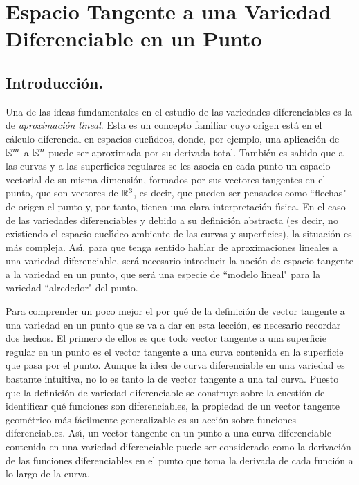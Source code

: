 \documentclass[cursovd_portada.tex]{subfiles}
\begin{document}
\chapter{Espacio Tangente a una Variedad Diferenciable en un Punto}
\section{Introducci\'{o}n.}
\hs Una de las ideas fundamentales en el estudio de las variedades
diferenciables es la de {\it aproximaci\'{o}n lineal}. Esta es un
concepto familiar cuyo origen est\'{a} en el c\'{a}lculo
diferencial en espacios eucl\'{\i}deos, donde, por ejemplo, una
aplicaci\'{o}n de $\mathbb{R}^m$ a $\mathbb{R}^n$ puede ser aproximada por su
derivada total. Tambi\'{e}n es sabido que a las curvas y a las
superficies regulares se les asocia en cada punto un espacio
vectorial de su misma dimensi\'{o}n, formados por sus vectores
tangentes en el punto, que son vectores de $\mathbb{R}^3$, es decir, que
pueden ser pensados como ``flechas" de origen el punto y, por
tanto, tienen una clara interpretaci\'{o}n f\'{\i}sica. En el caso
de las variedades diferenciables y debido a su definici\'{o}n
abstracta (es decir, no existiendo el espacio eucl\'{\i}deo
ambiente de las curvas y superficies), la situaci\'{o}n es m\'{a}s
compleja. As\'{\i}, para que tenga sentido hablar de
aproximaciones lineales a una variedad diferenciable, ser\'{a}
necesario introducir la noci\'{o}n de espacio tangente a la
variedad en un punto, que ser\'{a} una especie de ``modelo lineal"
para la variedad ``alrededor" del punto.
\par
Para comprender un poco mejor el por qu\'{e} de la definici\'{o}n  de vector tangente a una variedad en un punto que se va
a dar en esta lecci\'{o}n, es necesario recordar dos hechos. El primero de ellos es que todo vector tangente a una
superficie regular en un punto es el vector tangente a una curva contenida en la superficie que pasa por el punto.
Aunque la idea de curva diferenciable en una variedad es bastante intuitiva, no lo es tanto la de vector tangente
a una tal curva. Puesto que la definici\'{o}n de variedad diferenciable se construye sobre la cuesti\'{o}n  de identificar
qu\'{e} funciones son diferenciables, la propiedad de un vector tangente geom\'{e}trico m\'{a}s f\'{a}cilmente generalizable es su
acci\'{o}n sobre funciones diferenciables. As\'{\i}, un vector tangente en un punto a una curva diferenciable contenida en
una variedad diferenciable puede ser considerado como la derivaci\'{o}n de las funciones diferenciables en el punto
que toma la derivada de cada funci\'{o}n a lo largo de la curva.
\end{document}
